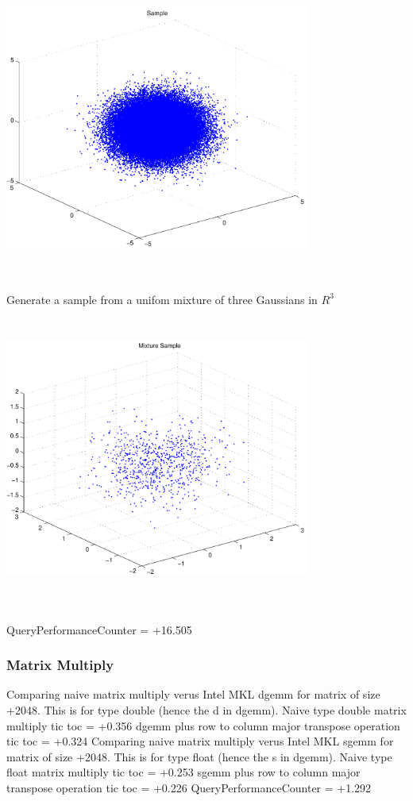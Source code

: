 \documentclass[9pt]{article}
\theoremstyle{plain}
\theoremstyle{definition}
\theoremstyle{remark}
\numberwithin{equation}{section}
\begin{document}
\includegraphics[width=10.0cm,height=10.0cm]{R_3_Normal.pdf}

Generate a sample from a unifom mixture of three Gaussians in $R^3$
\includegraphics[width=10.0cm,height=10.0cm]{R_3_Normal_Mixture.pdf}

QueryPerformanceCounter  =  +16.505
\subsubsection{Matrix Multiply}
Comparing naive matrix multiply verus Intel MKL dgemm for matrix of size +2048.
This is for type double (hence the d in dgemm).
Naive type double matrix multiply tic toc  =  +0.356
dgemm plus row to column major transpose operation tic toc  =  +0.324
Comparing naive matrix multiply verus Intel MKL sgemm for matrix of size +2048.
This is for type float (hence the s in dgemm).
Naive type float matrix multiply tic toc  =  +0.253
sgemm plus row to column major transpose operation tic toc  =  +0.226
QueryPerformanceCounter  =  +1.292
\end{document}
